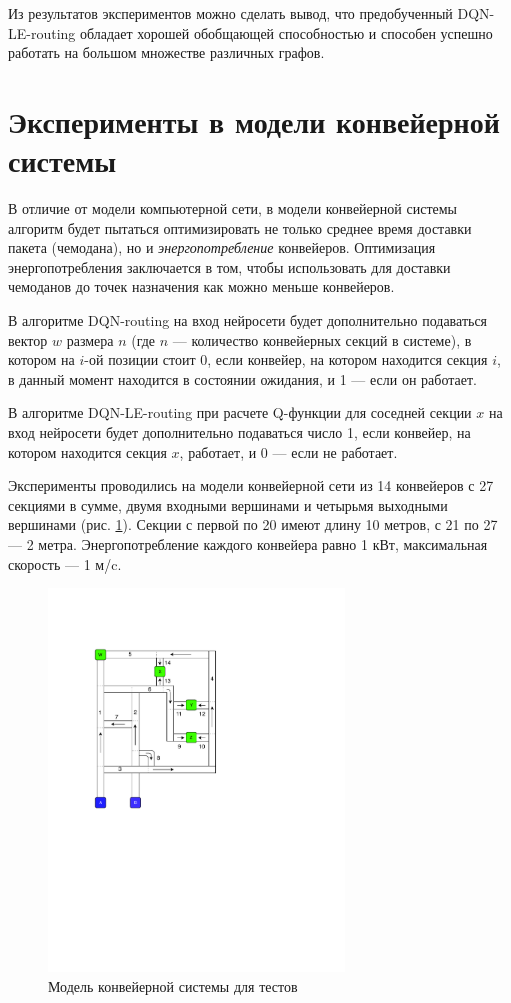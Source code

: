 \documentclass[specification,annotation,times]{itmo-student-thesis}
\theoremstyle{definition}
\begin{document}
Из результатов экспериментов можно сделать вывод, что предобученный DQN-LE-routing обладает
хорошей обобщающей способностью и способен успешно работать на большом множестве
различных графов.

\section{Эксперименты в модели конвейерной системы}\label{experiments:conveyors}

В отличие от модели компьютерной сети, в модели конвейерной системы алгоритм
будет пытаться оптимизировать не только среднее время доставки пакета
(чемодана), но и \textit{энергопотребление} конвейеров. Оптимизация
энергопотребления заключается в том, чтобы использовать для доставки чемоданов
до точек назначения как можно меньше конвейеров.

В алгоритме DQN-routing на вход нейросети будет дополнительно подаваться вектор
$w$ размера $n$ (где $n$ --- количество конвейерных секций в системе), в котором на $i$-ой
позиции стоит 0, если конвейер, на котором находится секция $i$, в данный момент
находится в состоянии ожидания, и 1 --- если он работает.

В алгоритме DQN-LE-routing при расчете Q-функции для соседней секции $x$ на вход
нейросети будет дополнительно подаваться число 1, если конвейер, на котором
находится секция $x$, работает, и 0 --- если не работает.

Эксперименты проводились на модели конвейерной сети из 14 конвейеров с 27
секциями в сумме, двумя входными вершинами и четырьмя выходными вершинами (рис.
\ref{test-conveyors}). Секции с первой по 20 имеют длину 10 метров, с 21 по 27 --- 2
метра. Энергопотребление каждого конвейера равно 1 кВт, максимальная
скорость --- 1 м/c.

\begin{figure}[!h]
  \caption{Модель конвейерной системы для тестов}\label{test-conveyors}
  \centering
  \includegraphics[width=0.7\textwidth]{conveyor-1-illustration-1}
\end{figure}
\end{document}

